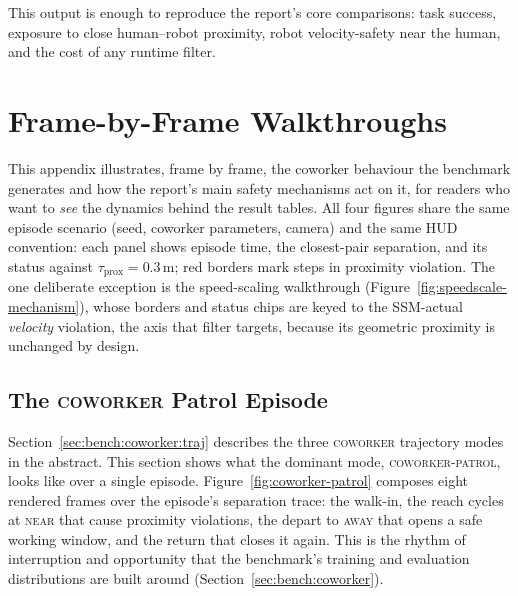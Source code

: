 \documentclass[11pt,a4paper]{report}
\newcommand{\ssm}{SSM}
\newcommand{\coworker}{\textsc{coworker}}
\begin{document}
This output is enough to reproduce the report's core comparisons:
task success, exposure to close human--robot proximity, robot
velocity-safety near the human, and the cost of any runtime filter.

\chapter{Frame-by-Frame Walkthroughs}
\label{app:walkthroughs}

This appendix illustrates, frame by frame, the coworker behaviour the
benchmark generates and how the report's main safety mechanisms act on
it, for readers who want to \emph{see} the dynamics behind the result
tables. All four figures share the same episode scenario (seed, coworker
parameters, camera) and the same HUD convention: each panel shows
episode time, the closest-pair separation, and its status against
$\tau_{\mathrm{prox}} = 0.3$\,m; red borders mark steps in proximity
violation. The one deliberate exception is the speed-scaling
walkthrough (Figure~\ref{fig:speedscale-mechanism}), whose borders and
status chips are keyed to the \ssm{}-actual \emph{velocity} violation,
the axis that filter targets, because its geometric proximity is
unchanged by design.

\section{The \coworker{} Patrol Episode}
\label{app:patrol-episode}

Section~\ref{sec:bench:coworker:traj} describes the three \coworker{}
trajectory modes in the abstract. This section shows what the dominant
mode, \textsc{coworker-patrol}, looks like over a single episode.
Figure~\ref{fig:coworker-patrol} composes eight rendered frames over
the episode's separation trace: the walk-in, the reach cycles at
\textsc{near} that cause proximity violations, the depart to
\textsc{away} that opens a safe working window, and the return that
closes it again. This is the rhythm of interruption and opportunity
that the benchmark's training and evaluation distributions are built
around (Section~\ref{sec:bench:coworker}).
\end{document}
